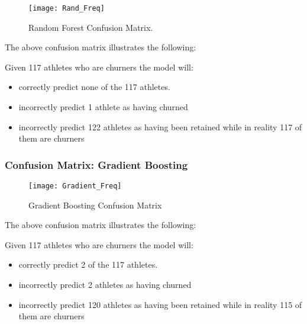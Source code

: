 \documentclass[
10pt, %
a4paper, %
oneside, %
headinclude,footinclude, %
BCOR5mm, %
]{scrartcl}
\begin{document}
\begin{figure}[H]
\centering 
\texttt{[image: Rand\_Freq]} 
\caption[Lostic Regression Confusion Matrix]{Random Forest Confusion Matrix. } %
\label{fig:gallery} 
\end{figure}

The above confusion matrix illustrates the following: 

Given 117 athletes who are churners the model will:

\begin{itemize}
\item correctly predict none of the 117 athletes. 
\item incorrectly predict 1 athlete as having churned 
\item incorrectly predict 122 athletes as having been retained while in reality 117 of them are churners
\end{itemize}

\subsubsection{\textbf{Confusion Matrix}: Gradient Boosting}

\begin{figure}[H]
\centering 
\texttt{[image: Gradient\_Freq]} 
\caption[Lostic Regression Confusion Matrix]{Gradient Boosting Confusion Matrix} %
\label{fig:gallery} 
\end{figure}

The above confusion matrix illustrates the following: 

Given 117 athletes who are churners the model will:

\begin{itemize}
\item correctly predict 2 of the 117 athletes. 
\item incorrectly predict 2 athletes as having churned 
\item incorrectly predict 120 athletes as having been retained while in reality 115 of them are churners
\end{itemize}

\pagebreak
\end{document}

